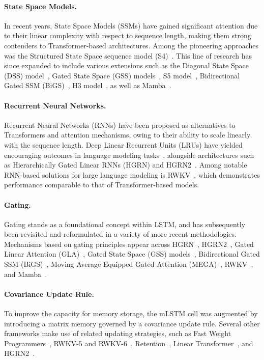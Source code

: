 \paragraph{State Space Models.} In recent years, State Space Models (SSMs) have gained significant attention due to their linear complexity with respect to sequence length, making them strong contenders to Transformer-based architectures. Among the pioneering approaches was the Structured State Space sequence model (S4)~\citep{Gu:21}. This line of research has since expanded to include various extensions such as the Diagonal State Space (DSS) model~\citep{Gupta:22}, Gated State Space (GSS) models~\citep{Mehta:22}, S5 model~\citep{Smith:22}, Bidirectional Gated SSM (BiGS)~\citep{Wang:22}, H3 model~\citep{Fu:23}, as well as Mamba~\citep{Gu:24arxiv}.

\paragraph{Recurrent Neural Networks.} Recurrent Neural Networks (RNNs) have been proposed as alternatives to Transformers and attention mechanisms, owing to their ability to scale linearly with the sequence length. Deep Linear Recurrent Units (LRUs) have yielded encouraging outcomes in language modeling tasks~\citep{Orvieto:23, De:24arxiv}, alongside architectures such as Hierarchically Gated Linear RNNs (HGRN) \citep{Qin:23} and HGRN2~\citep{Qin:24arxiv}. Among notable RNN-based solutions for large language modeling is RWKV~\citep{Peng:23arxivshort,Peng:24arxivshort}, which demonstrates performance comparable to that of Transformer-based models.

\paragraph{Gating.}
Gating stands as a foundational concept within LSTM, and has subsequently been revisited and reformulated in a variety of more recent methodologies. Mechanisms based on gating principles appear across HGRN~\citep{Qin:23}, HGRN2~\citep{Qin:24arxiv}, Gated Linear Attention (GLA)~\citep{Yang:23arxiv}, Gated State Space (GSS) models~\citep{Mehta:22}, Bidirectional Gated SSM (BiGS)~\citep{Wang:22}, Moving Average Equipped Gated Attention (MEGA)~\citep{Ma:22}, RWKV~\citep{Peng:23arxivshort}, and Mamba~\citep{Gu:24arxiv}.

\paragraph{Covariance Update Rule.} To improve the capacity for memory storage, the mLSTM cell was augmented by introducing a matrix memory governed by a covariance update rule. Several other frameworks make use of related updating strategies, such as Fast Weight Programmers~\citep{Schmidhuber:92ncfastweights,Schlag:21}, RWKV-5 and RWKV-6~\citep{Peng:24arxivshort}, Retention~\citep{Sun:23arxiv}, Linear Transformer~\citep{Katharopoulos:20}, and HGRN2~\citep{Qin:24arxiv}.

